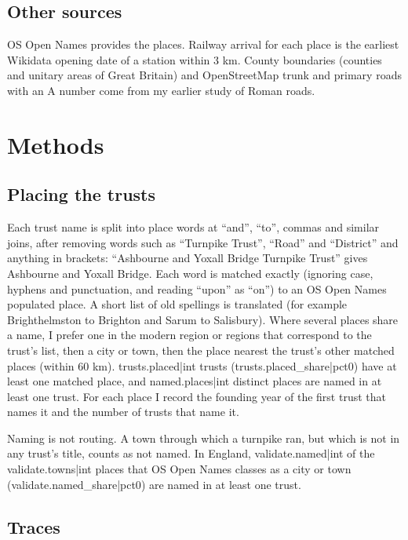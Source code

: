 \documentclass[11pt,a4paper]{article}
\begin{document}
\subsection{Other sources}

OS Open Names provides the places. Railway arrival for each place is the earliest Wikidata opening date of a station within 3 km. County boundaries (counties and unitary areas of Great Britain) and OpenStreetMap trunk and primary roads with an A number come from my earlier study of Roman roads.

\section{Methods}

\subsection{Placing the trusts}

Each trust name is split into place words at ``and'', ``to'', commas and similar joins, after removing words such as ``Turnpike Trust'', ``Road'' and ``District'' and anything in brackets: ``Ashbourne and Yoxall Bridge Turnpike Trust'' gives Ashbourne and Yoxall Bridge. Each word is matched exactly (ignoring case, hyphens and punctuation, and reading ``upon'' as ``on'') to an OS Open Names populated place. A short list of old spellings is translated (for example Brighthelmston to Brighton and Sarum to Salisbury). Where several places share a name, I prefer one in the modern region or regions that correspond to the trust's list, then a city or town, then the place nearest the trust's other matched places (within 60 km). {{trusts.placed|int}} trusts ({{trusts.placed_share|pct0}}) have at least one matched place, and {{named.places|int}} distinct places are named in at least one trust. For each place I record the founding year of the first trust that names it and the number of trusts that name it.

Naming is not routing. A town through which a turnpike ran, but which is not in any trust's title, counts as not named. In England, {{validate.named|int}} of the {{validate.towns|int}} places that OS Open Names classes as a city or town ({{validate.named_share|pct0}}) are named in at least one trust.

\subsection{Traces}
\end{document}
